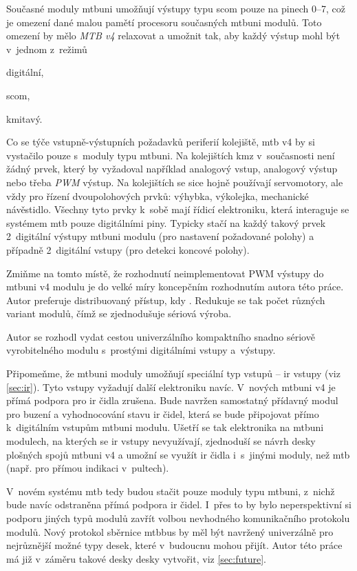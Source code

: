 Současné moduly \gls{mtbuni} umožňují výstupy typu \gls{scom} pouze na pinech
0–7, což je omezení dané malou pamětí procesoru současných \gls{mtbuni} modulů.
Toto omezení by mělo \textit{MTB v4} relaxovat a umožnit tak, aby každý výstup
mohl být v~jednom z~režimů

\begin{compactenum}
\item digitální,
\item \gls{scom},
\item kmitavý.
\end{compactenum}

Co se týče vstupně-výstupních požadavků periferií kolejiště, \gls{mtb} v4 by
si vystačilo pouze s~moduly typu \gls{mtbuni}. Na kolejištích \gls{kmz}
v~současnosti není žádný prvek, který by vyžadoval například analogový vstup,
analogový výstup nebo třeba \textit{PWM} výstup. Na kolejištích se sice hojně
používají servomotory, ale vždy pro řízení dvoupolohových prvků: výhybka,
výkolejka, mechanické návěstidlo. Všechny tyto prvky k~sobě mají řídicí
elektroniku, která interaguje se systémem \gls{mtb} pouze digitálními piny.
Typicky stačí na každý takový prvek 2~digitální výstupy \gls{mtbuni} modulu
(pro nastavení požadované polohy) a případně 2~digitální vstupy (pro detekci
koncové polohy).

Zmiňme na tomto místě, že rozhodnutí neimplementovat PWM výstupy do
\gls{mtbuni} v4 modulu je do velké míry koncepčním rozhodnutím autora této
práce. Autor preferuje distribuovaný přístup, kdy . Redukuje se tak počet různých variant modulů, čímž
se zjednodušuje sériová výroba.

Autor se rozhodl vydat cestou univerzálního
kompaktního snadno sériově vyrobitelného modulu s~prostými digitálními vstupy
a~výstupy.

Připomeňme, že \gls{mtbuni} moduly umožňují speciální typ vstupů – \gls{ir} vstupy
(viz \ref{sec:ir}). Tyto vstupy vyžadují další elektroniku navíc.  V~nových
\gls{mtbuni} v4 je přímá podpora pro \gls{ir} čidla zrušena. Bude navržen
samostatný přídavný modul pro buzení a vyhodnocování stavu \gls{ir} čidel,
která se bude připojovat přímo k~digitálním vstupům \gls{mtbuni} modulu. Ušetří
se tak elektronika na \gls{mtbuni} modulech, na kterých se \gls{ir} vstupy
nevyužívají, zjednoduší se návrh desky plošných spojů \gls{mtbuni} v4 a umožní
se využít \gls{ir} čidla i~s~jinými moduly, než \gls{mtb} (např. pro přímou
indikaci v~pultech).

V~novém systému \gls{mtb} tedy budou stačit pouze moduly typu \gls{mtbuni},
z~nichž bude navíc odstraněna přímá podpora \gls{ir} čidel. I~přes to by bylo
neperspektivní si podporu jiných typů modulů zavřít volbou nevhodného
komunikačního protokolu modulů. Nový protokol sběrnice \gls{mtbbus} by měl být
navržený univerzálně pro nejrůznější možné typy desek, které v~budoucnu mohou
přijít.  Autor této práce má již v~záměru takové desky desky vytvořit, viz
\ref{sec:future}.

